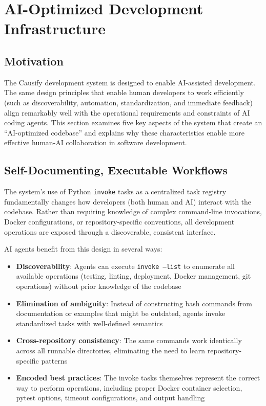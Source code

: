 \section{AI-Optimized Development Infrastructure}

\subsection{Motivation}

The Causify development system is designed to enable AI-assisted development.
The same design principles that enable human developers to work efficiently
(such as discoverability, automation, standardization, and immediate feedback)
align remarkably well with the operational requirements and constraints of AI
coding agents. This section examines five key aspects of the system that create
an ``AI-optimized codebase'' and explains why these characteristics enable more
effective human-AI collaboration in software development.

\subsection{Self-Documenting, Executable Workflows}

The system's use of Python \texttt{invoke} tasks as a centralized task
registry fundamentally changes how developers (both human and AI) interact
with the codebase. Rather than requiring knowledge of complex command-line
invocations, Docker configurations, or repository-specific conventions,
all development operations are exposed through a discoverable, consistent
interface.

AI agents benefit from this design in several ways:

\begin{itemize}
  \item \textbf{Discoverability}: Agents can execute \texttt{invoke --list}
    to enumerate all available operations (testing, linting, deployment,
    Docker management, git operations) without prior knowledge of the codebase

  \item \textbf{Elimination of ambiguity}: Instead of constructing bash
    commands from documentation or examples that might be outdated, agents
    invoke standardized tasks with well-defined semantics

  \item \textbf{Cross-repository consistency}: The same commands work
    identically across all runnable directories, eliminating the need
    to learn repository-specific patterns

  \item \textbf{Encoded best practices}: The invoke tasks themselves
    represent the correct way to perform operations, including proper
    Docker container selection, pytest options, timeout configurations,
    and output handling
\end{itemize}

